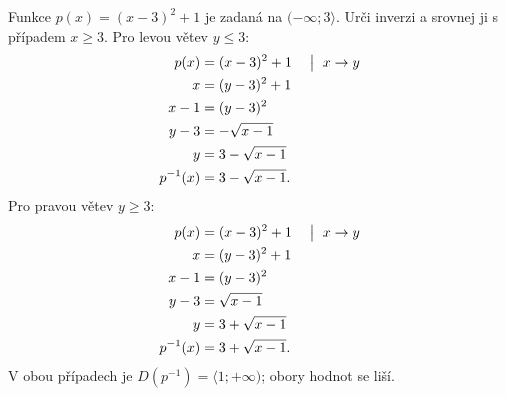 \documentclass[11pt,a4paper]{article}
\begin{document}
\begin{zadaniReseniBox}[title={Rozšíření 1}]
Funkce $p(x)=(x-3)^2+1$ je zadaná na $(-\infty;3\rangle$. Urči inverzi a srovnej ji s případem $x\ge3$.
\tcblower
Pro levou větev $y\le3$:
\[
\begin{aligned}
p(x)&=(x-3)^2+1 &&\bigm|\ x\to y\\
x&=(y-3)^2+1\\
x-1&=(y-3)^2\\
y-3&=-\sqrt{x-1}\\
y&=3-\sqrt{x-1}\\
p^{-1}(x)&=3-\sqrt{x-1}.
\end{aligned}
\]
Pro pravou větev $y\ge3$:
\[
\begin{aligned}
p(x)&=(x-3)^2+1 &&\bigm|\ x\to y\\
x&=(y-3)^2+1\\
x-1&=(y-3)^2\\
y-3&=\sqrt{x-1}\\
y&=3+\sqrt{x-1}\\
p^{-1}(x)&=3+\sqrt{x-1}.
\end{aligned}
\]
V obou případech je $D(p^{-1})=\langle1;+\infty)$; obory hodnot se liší.
\end{zadaniReseniBox}
\end{document}
